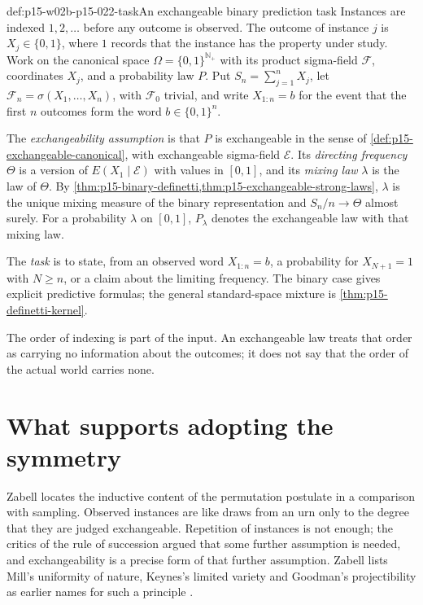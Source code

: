 \begin{hbdefinition}{def:p15-w02b-p15-022-task}{An exchangeable binary prediction task}
Instances are indexed \(1,2,\ldots\) before any outcome is observed. The
outcome of instance \(j\) is \(X_j\in\{0,1\}\), where \(1\) records that
the instance has the property under study. Work on the canonical space
\(\Omega=\{0,1\}^{\mathbb N_+}\) with its product sigma-field \(\mathcal F\),
coordinates \(X_j\), and a probability law \(P\). Put
\(S_n=\sum_{j=1}^nX_j\), let \(\mathcal F_n=\sigma(X_1,\ldots,X_n)\),
with \(\mathcal F_0\) trivial, and write \(X_{1:n}=b\) for the event that
the first \(n\) outcomes form the word \(b\in\{0,1\}^n\).

The \emph{exchangeability assumption} is that \(P\) is exchangeable in the
sense of \cref{def:p15-exchangeable-canonical}, with exchangeable
sigma-field \(\mathcal E\). Its \emph{directing frequency} \(\Theta\) is a
version of \(E(X_1\mid\mathcal E)\) with values in \([0,1]\), and its
\emph{mixing law} \(\lambda\) is the law of \(\Theta\). By
\cref{thm:p15-binary-definetti,thm:p15-exchangeable-strong-laws},
\(\lambda\) is the unique mixing measure of the binary representation and
\(S_n/n\to\Theta\) almost surely. For a probability \(\lambda\) on
\([0,1]\), \(P_\lambda\) denotes the exchangeable law with that mixing law.

The \emph{task} is to state, from an observed word \(X_{1:n}=b\), a
probability for \(X_{N+1}=1\) with \(N\geq n\), or a claim about the
limiting frequency. The binary case gives explicit predictive formulas;
the general standard-space mixture is \cref{thm:p15-definetti-kernel}.
\end{hbdefinition}

The order of indexing is part of the input. An exchangeable law treats
that order as carrying no information about the outcomes; it does not say
that the order of the actual world carries none.

\section{What supports adopting the symmetry}
\label{sec:p15-w02b-p15-022-support}

Zabell locates the inductive content of the permutation postulate in a
comparison with sampling. Observed instances are like draws from an urn
only to the degree that they are judged exchangeable. Repetition of
instances is not enough; the critics of the rule of succession argued that
some further assumption is needed, and exchangeability is a precise form of
that further assumption. Zabell lists Mill's uniformity of nature, Keynes's
limited variety and Goodman's projectibility as earlier names for such a
principle \cite[p.~272]{Zabell2011CarnapInductiveInference}.

